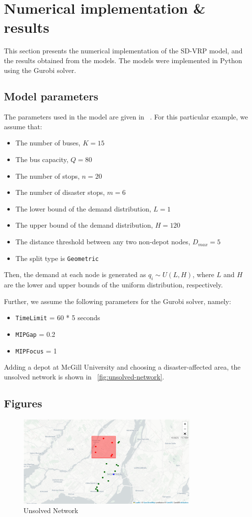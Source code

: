 \documentclass[12pt]{article}
\begin{document}
\newpage
\section{Numerical implementation \& results}
This section presents the numerical implementation of the SD-VRP model, and the results obtained from the models.
The models were implemented in Python using the Gurobi solver.

\subsection{Model parameters}
The parameters used in the model are given in ~. For this particular example, we assume that:
\begin{itemize}
    \item The number of buses, $K = 15$
    \item The bus capacity, $Q = 80$
    \item The number of stops, $n = 20$
    \item The number of disaster stops, $m = 6$
    \item The lower bound of the demand distribution, $L = 1$
    \item The upper bound of the demand distribution, $H = 120$
    \item The distance threshold between any two non-depot nodes, $D_{max} = 5$
    \item The split type is \texttt{Geometric}
\end{itemize}

Then, the demand at each node is generated as $q_i \sim U(L, H)$, where $L$ and $H$ are the lower and upper bounds of the uniform distribution, respectively.

Further, we assume the following parameters for the Gurobi solver, namely:
\begin{itemize}
    \item \texttt{TimeLimit} = 60 * 5 seconds
    \item \texttt{MIPGap} = 0.2
    \item \texttt{MIPFocus} = 1
\end{itemize}

Adding a depot at McGill University and choosing a disaster-affected area, the unsolved network is shown in ~\autoref{fig:unsolved-network}.



\newpage
\begin{appendices}
    \section{Figures}\label{app:figures}
    \begin{figure}[h]
        \centering
        \includegraphics[width=0.8\textwidth]{unsolved-network.png}
        \caption{Unsolved Network}
        \label{fig:unsolved-network}
    \end{figure}
\end{appendices}
\end{document}
